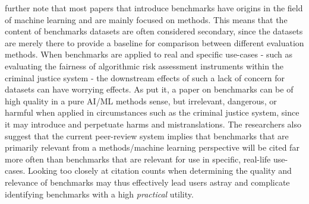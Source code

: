 \citet{bao2022a} further note that most papers that introduce benchmarks have origins in the field of machine learning and are mainly focused on methods. This means that the content of benchmarks datasets are often considered secondary, since the datasets are merely there to provide a baseline for comparison between different evaluation methods. When benchmarks are applied to real and specific use-cases - such as evaluating the fairness of algorithmic risk assessment instruments within the criminal justice system - the downstream effects of such a lack of concern for datasets can have worrying effects.
As \citet{bao2022a} put it, a paper on benchmarks can be of high quality in a pure AI/ML methods sense, but irrelevant, dangerous, or harmful when applied in circumstances such as the criminal justice system, since it may introduce and perpetuate harms and mistranslations. The researchers also suggest that the current peer-review system implies that benchmarks that are primarily relevant from a methods/machine learning perspective will be cited far more often than benchmarks that are relevant for use in specific, real-life use-cases. Looking too closely at citation counts when determining the quality and relevance of benchmarks may thus effectively lead users astray and complicate identifying benchmarks with a high \textit{practical} utility. %

